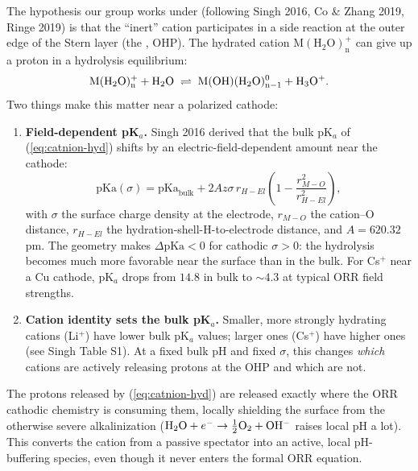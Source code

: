 \documentclass[11pt]{article}
\begin{document}
The hypothesis our group works under (following Singh 2016, Co \&
Zhang 2019, Ringe 2019) is that the ``inert'' cation participates in
a side reaction at the outer edge of the Stern layer (the
, OHP). The hydrated cation
$\mathrm{M(H_2O)_n^+}$ can give up a proton in a hydrolysis
equilibrium:
\begin{equation}
  \mathrm{M(H_2O)_n^+} + \mathrm{H_2O}
  \;\rightleftharpoons\;
  \mathrm{M(OH)(H_2O)_{n-1}^{0}} + \mathrm{H_3 O^+}.
  \label{eq:catnion-hyd}
\end{equation}
Two things make this matter near a polarized cathode:

\begin{enumerate}[leftmargin=*]
\item \textbf{Field-dependent pK$_a$.} Singh 2016 derived that the
      bulk pK$_a$ of (\ref{eq:catnion-hyd}) shifts by an
      electric-field-dependent amount near the cathode:
      \begin{equation}
        \mathrm{pKa}(\sigma) = \mathrm{pKa}_{\mathrm{bulk}}
          + 2 A z \sigma\, r_{H\!-\!El}
            \left(1 - \frac{r_{M-O}^2}{r_{H\!-\!El}^2}\right),
        \label{eq:singh}
      \end{equation}
      with $\sigma$ the surface charge density at the electrode,
      $r_{M-O}$ the cation--O distance, $r_{H\!-\!El}$ the
      hydration-shell-H-to-electrode distance, and $A = 620.32$ pm.
      The geometry makes $\Delta\mathrm{pKa} < 0$ for cathodic
      $\sigma > 0$: the hydrolysis becomes much more favorable near
      the surface than in the bulk. For Cs$^+$ near a Cu cathode,
      pK$_a$ drops from $14.8$ in bulk to $\sim 4.3$ at typical
      ORR field strengths.
\item \textbf{Cation identity sets the bulk pK$_a$.} Smaller, more
      strongly hydrating cations (Li$^+$) have lower bulk pK$_a$
      values; larger ones (Cs$^+$) have higher ones (see Singh
      Table S1). At a fixed bulk pH and fixed $\sigma$, this
      changes \emph{which} cations are actively releasing protons
      at the OHP and which are not.
\end{enumerate}

The protons released by (\ref{eq:catnion-hyd}) are released exactly
where the ORR cathodic chemistry is consuming them, locally
shielding the surface from the otherwise severe alkalinization
($\mathrm{H_2O} + e^- \to \tfrac{1}{2}\mathrm{O_2} + \mathrm{OH^-}$ raises local pH a lot).
This converts the cation from a passive spectator into an active,
local pH-buffering species, even though it never enters the formal
ORR equation.
\end{document}
